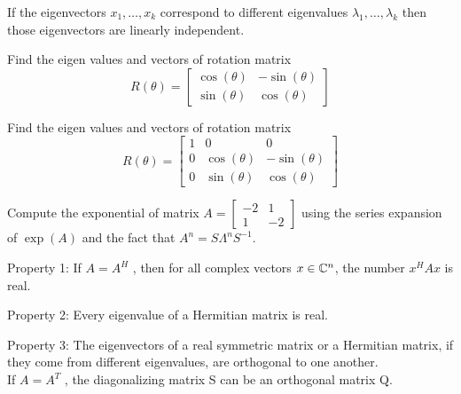 \documentclass[times,t]{beamer}
\begin{document}
\begin{frame}
  If the eigenvectors $x_1, \dots, x_k$ correspond to different eigenvalues
  $\lambda_1, \dots, \lambda_k$ then those eigenvectors are linearly independent.
  \end{frame}

\begin{frame}
  Find the eigen values and vectors of rotation matrix
  \[
    R(\theta) = \begin{bmatrix}
      \cos(\theta) & -\sin(\theta) \\
      \sin(\theta) & \cos(\theta)
      \end{bmatrix}
    \]
\end{frame}

\begin{frame}
  Find the eigen values and vectors of rotation matrix
  \[
    R(\theta) = \begin{bmatrix}
      1 & 0 & 0 \\
      0 & \cos(\theta) & -\sin(\theta) \\
      0 & \sin(\theta) & \cos(\theta)
    \end{bmatrix}
  \]
\end{frame}

\begin{frame}
  Compute the exponential of matrix $A = \begin{bmatrix} -2 & 1 \\ 1 &
    -2\end{bmatrix}$ using the series expansion of $\exp(A)$ and  the fact that
  $A^n =  S\Lambda^nS^{-1}$.
  \end{frame}

\begin{frame}
    Property 1: If $A = A^H$ , then for all complex vectors $x \in \mathbb{C}^n$, the number $x^HAx$ is real.
\end{frame}
\begin{frame}
    Property 2: Every eigenvalue of a Hermitian matrix is real.
\end{frame}

\begin{frame}
  Property 3: The eigenvectors of a real symmetric matrix or a Hermitian matrix, if
  they come from different eigenvalues, are orthogonal to one another.
  \\
  If $A = A^T$ , the diagonalizing matrix S can be an orthogonal matrix Q.
\end{frame}
\end{document}
